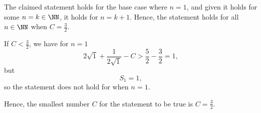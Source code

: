 \begin{enumerate}
          The claimed statement holds for the base case where \(n = 1\), and given it holds for some \(n = k \in \NN\), it holds for \(n = k + 1\). Hence, the statement holds for all \(n \in \NN\) when \(C = \frac{3}{2}\).

          If \(C < \frac{3}{2}\), we have for \(n = 1\)
          \[
              2\sqrt{1} + \frac{1}{2 \sqrt{1}} - C > \frac{5}{2} - \frac{3}{2} = 1,
          \]
          but
          \[
              S_1 = 1,
          \]
          so the statement does not hold for when \(n = 1\).

          Hence, the smallest number \(C\) for the statement to be true is \(C = \frac{3}{2}\).
\end{enumerate}
